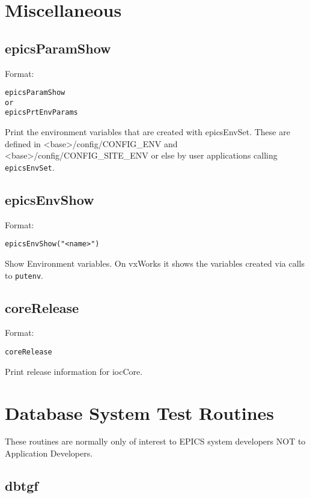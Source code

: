 \section{Miscellaneous}

\subsection{epicsParamShow}

Format:

\begin{verbatim}
epicsParamShow
or
epicsPrtEnvParams
\end{verbatim}

Print the environment variables that are created with epicsEnvSet. These are defined in \textless{}base\textgreater{}/config/CONFIG\_ENV 
and \textless{}base\textgreater{}/config/CONFIG\_SITE\_ENV or else by user applications calling \verb|epicsEnvSet|.

\subsection{epicsEnvShow}

Format:

\begin{verbatim}
epicsEnvShow("<name>")
\end{verbatim}

Show Environment variables. On vxWorks it shows the variables created via calls to \verb|putenv|.

\subsection{coreRelease}

Format:

\begin{verbatim}
coreRelease
\end{verbatim}

Print release information for iocCore.

\section{Database System Test Routines}

These routines are normally only of interest to EPICS system developers NOT to Application Developers.

\subsection{dbtgf}

